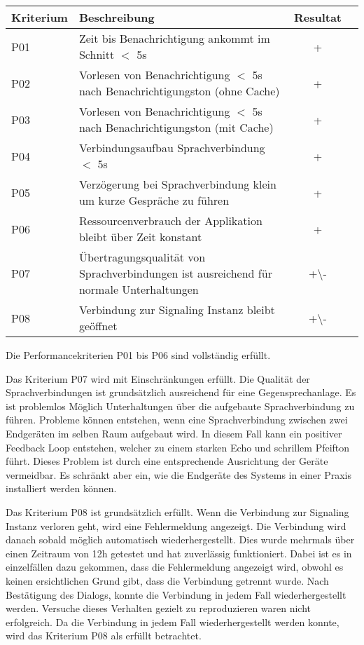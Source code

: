 \begin{table}[h]
    \centering
    \begin{tabular}{|l|p{11cm}|c|c|}
        \hline
        \textbf{Kriterium} & \textbf{Beschreibung} & \textbf{Resultat} \\
        \hline
        P01         & Zeit bis Benachrichtigung ankommt im Schnitt $<$ 5s & +\\
        \hline
        P02         & Vorlesen von Benachrichtigung $<$ 5s nach Benachrichtigungston (ohne Cache) & +\\
        \hline
        P03         & Vorlesen von Benachrichtigung $<$ 5s nach Benachrichtigungston (mit Cache) & +\\
        \hline
        P04         & Verbindungsaufbau Sprachverbindung $<$ 5s  & +\\
        \hline
        P05         & Verzögerung bei Sprachverbindung klein um kurze Gespräche zu führen & +\\
        \hline
        P06         & Ressourcenverbrauch der Applikation bleibt über Zeit konstant & +\\
        \hline
        P07         & Übertragungsqualität von Sprachverbindungen ist ausreichend für normale Unterhaltungen & +\textbackslash- \\
        \hline
        P08         & Verbindung zur Signaling Instanz bleibt geöffnet & +\textbackslash- \\
        \hline
    \end{tabular}\label{tab:testplan_performance}
\end{table}

Die Performancekriterien P01 bis P06 sind vollständig erfüllt.

Das Kriterium P07 wird mit Einschränkungen erfüllt.
Die Qualität der Sprachverbindungen ist grundsätzlich ausreichend für eine Gegensprechanlage.
Es ist problemlos Möglich Unterhaltungen über die aufgebaute Sprachverbindung zu führen.
Probleme können entstehen, wenn eine Sprachverbindung zwischen zwei Endgeräten im selben Raum aufgebaut wird.
In diesem Fall kann ein positiver Feedback Loop entstehen, welcher zu einem starken Echo und schrillem Pfeifton führt.
Dieses Problem ist durch eine entsprechende Ausrichtung der Geräte vermeidbar.
Es schränkt aber ein, wie die Endgeräte des Systems in einer Praxis installiert werden können.

Das Kriterium P08 ist grundsätzlich erfüllt.
Wenn die Verbindung zur Signaling Instanz verloren geht, wird eine Fehlermeldung angezeigt.
Die Verbindung wird danach sobald möglich automatisch wiederhergestellt.
Dies wurde mehrmals über einen Zeitraum von 12h getestet und hat zuverlässig funktioniert.
Dabei ist es in einzelfällen dazu gekommen, dass die Fehlermeldung angezeigt wird, obwohl es keinen ersichtlichen Grund gibt, dass die Verbindung getrennt wurde.
Nach Bestätigung des Dialogs, konnte die Verbindung in jedem Fall wiederhergestellt werden.
Versuche dieses Verhalten gezielt zu reproduzieren waren nicht erfolgreich.
Da die Verbindung in jedem Fall wiederhergestellt werden konnte, wird das Kriterium P08 als erfüllt betrachtet.

\clearpage
